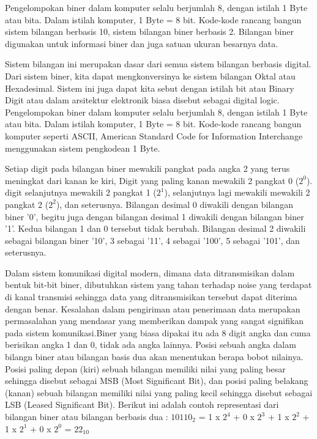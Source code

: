 \documentclass{article}
\begin{document}
Pengelompokan biner dalam komputer selalu berjumlah 8, dengan istilah 1 Byte atau bita. Dalam istilah komputer, 1 Byte = 8 bit. Kode-kode rancang bangun sistem bilangan berbasis 10, sistem bilangan biner berbasis 2. Bilangan biner digunakan untuk informasi biner dan juga satuan ukuran besarnya data.

Sistem bilangan ini merupakan dasar dari semua sistem bilangan berbasis digital. Dari sistem biner, kita dapat mengkonversinya ke sistem bilangan Oktal atau Hexadesimal. Sistem ini juga dapat kita sebut dengan istilah bit atau Binary Digit atau dalam arsitektur elektronik biasa disebut sebagai digital logic. Pengelompokan biner dalam komputer selalu berjumlah 8, dengan istilah 1 Byte atau bita. Dalam istilah komputer, 1 Byte = 8 bit. Kode-kode rancang bangun komputer seperti ASCII, American Standard Code for Information Interchange menggunakan sistem pengkodean 1 Byte.

Setiap digit pada bilangan biner mewakili pangkat pada angka 2 yang terus meningkat dari kanan ke kiri, Digit yang paling kanan mewakili 2 pangkat 0 ($2^0$). digit selanjutnya mewakili 2 pangkat 1 ($2^1$), selanjutnya lagi mewakili mewakili 2 pangkat 2 ($2^2$), dan seterusnya. Bilangan desimal 0 diwakili dengan bilangan biner '0', begitu juga dengan bilangan desimal 1 diwakili dengan bilangan biner '1'. Kedua bilangan 1 dan 0 tersebut tidak berubah. Bilangan desimal 2 diwakili sebagai bilangan biner '10', 3 sebagai '11', 4 sebagai '100', 5 sebagai '101', dan seterusnya.

Dalam sistem komunikasi digital modern, dimana data ditransmisikan dalam bentuk bit-bit biner, dibutuhkan sistem yang tahan terhadap noise yang terdapat di kanal transmisi sehingga data yang ditransmisikan tersebut dapat diterima dengan benar. Kesalahan dalam pengiriman atau penerimaan data merupakan permasalahan yang mendasar yang memberikan dampak yang sangat signifikan pada sistem komunikasi.Biner yang biasa dipakai itu ada 8 digit angka dan cuma berisikan angka 1 dan 0, tidak ada angka lainnya.
Posisi sebuah angka dalam bilangn biner atau bilangan basis dua akan menentukan berapa bobot nilainya. Posisi paling depan (kiri) sebuah bilangan memiliki nilai yang paling besar sehingga disebut sebagai MSB (Most Significant Bit), dan posisi paling belakang (kanan) sebuah bilangan memiliki nilai yang paling kecil sehingga disebut sebagai LSB (Leased Significant Bit). Berikut ini adalah contoh representasi dari bilangan biner atau bilangan berbasis dua : 
$10110_2$ = 1 x $2^4$ + 0 x $2^3$ + 1 x $2^2$ + 1 x $2^1$ + 0 x $2^0$ = $22_{10}$
\end{document}
